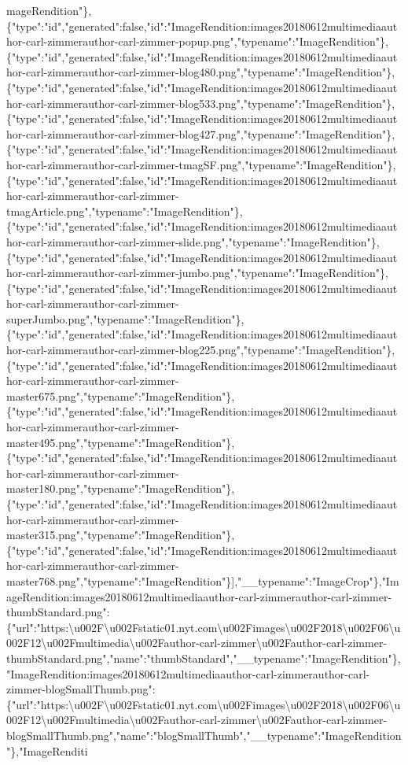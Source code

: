 mageRendition"\},\{"type":"id","generated":false,"id":"ImageRendition:images20180612multimediaauthor-carl-zimmerauthor-carl-zimmer-popup.png","typename":"ImageRendition"\},\{"type":"id","generated":false,"id":"ImageRendition:images20180612multimediaauthor-carl-zimmerauthor-carl-zimmer-blog480.png","typename":"ImageRendition"\},\{"type":"id","generated":false,"id":"ImageRendition:images20180612multimediaauthor-carl-zimmerauthor-carl-zimmer-blog533.png","typename":"ImageRendition"\},\{"type":"id","generated":false,"id":"ImageRendition:images20180612multimediaauthor-carl-zimmerauthor-carl-zimmer-blog427.png","typename":"ImageRendition"\},\{"type":"id","generated":false,"id":"ImageRendition:images20180612multimediaauthor-carl-zimmerauthor-carl-zimmer-tmagSF.png","typename":"ImageRendition"\},\{"type":"id","generated":false,"id":"ImageRendition:images20180612multimediaauthor-carl-zimmerauthor-carl-zimmer-tmagArticle.png","typename":"ImageRendition"\},\{"type":"id","generated":false,"id":"ImageRendition:images20180612multimediaauthor-carl-zimmerauthor-carl-zimmer-slide.png","typename":"ImageRendition"\},\{"type":"id","generated":false,"id":"ImageRendition:images20180612multimediaauthor-carl-zimmerauthor-carl-zimmer-jumbo.png","typename":"ImageRendition"\},\{"type":"id","generated":false,"id":"ImageRendition:images20180612multimediaauthor-carl-zimmerauthor-carl-zimmer-superJumbo.png","typename":"ImageRendition"\},\{"type":"id","generated":false,"id":"ImageRendition:images20180612multimediaauthor-carl-zimmerauthor-carl-zimmer-blog225.png","typename":"ImageRendition"\},\{"type":"id","generated":false,"id":"ImageRendition:images20180612multimediaauthor-carl-zimmerauthor-carl-zimmer-master675.png","typename":"ImageRendition"\},\{"type":"id","generated":false,"id":"ImageRendition:images20180612multimediaauthor-carl-zimmerauthor-carl-zimmer-master495.png","typename":"ImageRendition"\},\{"type":"id","generated":false,"id":"ImageRendition:images20180612multimediaauthor-carl-zimmerauthor-carl-zimmer-master180.png","typename":"ImageRendition"\},\{"type":"id","generated":false,"id":"ImageRendition:images20180612multimediaauthor-carl-zimmerauthor-carl-zimmer-master315.png","typename":"ImageRendition"\},\{"type":"id","generated":false,"id":"ImageRendition:images20180612multimediaauthor-carl-zimmerauthor-carl-zimmer-master768.png","typename":"ImageRendition"\}{]},"\_\_typename":"ImageCrop"\},"ImageRendition:images20180612multimediaauthor-carl-zimmerauthor-carl-zimmer-thumbStandard.png":\{"url":"https:\textbackslash{}u002F\textbackslash{}u002Fstatic01.nyt.com\textbackslash{}u002Fimages\textbackslash{}u002F2018\textbackslash{}u002F06\textbackslash{}u002F12\textbackslash{}u002Fmultimedia\textbackslash{}u002Fauthor-carl-zimmer\textbackslash{}u002Fauthor-carl-zimmer-thumbStandard.png","name":"thumbStandard","\_\_typename":"ImageRendition"\},"ImageRendition:images20180612multimediaauthor-carl-zimmerauthor-carl-zimmer-blogSmallThumb.png":\{"url":"https:\textbackslash{}u002F\textbackslash{}u002Fstatic01.nyt.com\textbackslash{}u002Fimages\textbackslash{}u002F2018\textbackslash{}u002F06\textbackslash{}u002F12\textbackslash{}u002Fmultimedia\textbackslash{}u002Fauthor-carl-zimmer\textbackslash{}u002Fauthor-carl-zimmer-blogSmallThumb.png","name":"blogSmallThumb","\_\_typename":"ImageRendition"\},"ImageRenditi